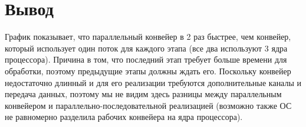 \section{Вывод}

График показывает, что параллельный конвейер в 2 раз быстрее, чем конвейер,
который использует один поток для каждого этапа (все два используют 3 ядра процессора).
Причина в том, что последний этап требует больше времени для обработки, поэтому предыдущие этапы должны ждать его.
Поскольку конвейер недостаточно длинный и для его реализации требуются дополнительные каналы и передача данных,
поэтому мы не видим здесь разницы между параллельным конвейером и параллельно-последовательной реализацией
(возможно также ОС не равномерно разделила рабочих конвейера на ядра процессора).
